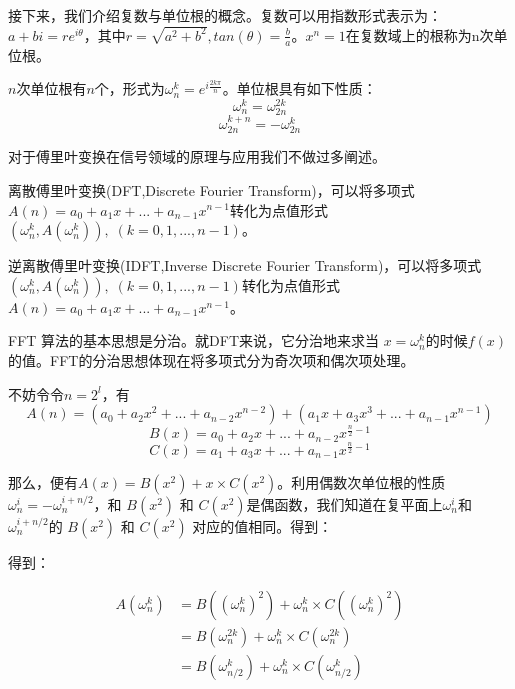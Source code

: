 \documentclass{article}
\begin{document}
接下来，我们介绍复数与单位根的概念。复数可以用指数形式表示为：$a+bi=re^{i\theta}$，其中$r=\sqrt{a^2+b^2},tan(\theta)=\frac{b}{a}$。$x^n=1$在复数域上的根称为n次单位根。

$n$次单位根有$n$个，形式为$\omega_n^k=e^{i\frac{2k\pi}{n}}$。单位根具有如下性质：
\begin{equation*}
    \omega_n^k=\omega_{2n}^{2k}
\end{equation*}
\begin{equation*}
    \omega_{2n}^{k+n}=-\omega_{2n}^k
\end{equation*}

对于傅里叶变换在信号领域的原理与应用我们不做过多阐述。

离散傅里叶变换(DFT,Discrete Fourier Transform)，可以将多项式$A(n)=a_0+a_1x+...+a_{n-1}x^{n-1}$转化为点值形式$(\omega_n^k,A(\omega_n^k)),\;(k=0,1,...,n-1)$。

逆离散傅里叶变换(IDFT,Inverse Discrete Fourier Transform)，可以将多项式$(\omega_n^k,A(\omega_n^k)),\;(k=0,1,...,n-1)$转化为点值形式$A(n)=a_0+a_1x+...+a_{n-1}x^{n-1}$。

FFT 算法的基本思想是分治。就DFT来说，它分治地来求当 
$x=\omega_n^k$的时候$f(x)$的值。FFT的分治思想体现在将多项式分为奇次项和偶次项处理。

不妨令令$n=2^l$，有
\begin{equation*}
    A(n)=(a_0+a_2x^2+...+a_{n-2}x^{n-2}) + (a_1x+a_3x^3+...+a_{n-1}x^{n-1})
\end{equation*}
\begin{equation*}
    B(x)=a_0+a_2x+...+a_{n-2}x^{\frac{n}{2}-1}
\end{equation*}
\begin{equation*}
    C(x)=a_1+a_3x+...+a_{n-1}x^{\frac{n}{2}-1}
\end{equation*}

那么，便有$A(x)=B(x^2)+x \times C(x^2)$。利用偶数次单位根的性质$\omega^i_n = -\omega^{i + n/2}_n$，和 $B\left(x^2\right)$ 和 $C\left(x^2\right)$是偶函数，我们知道在复平面上$\omega^i_n$和$\omega^{i+n/2}_n $的 $B(x^2)$ 和 $C(x^2)$ 对应的值相同。得到：

得到：

\begin{equation*}
\begin{split}
A(\omega_n^k) &= B((\omega_n^k)^2) + \omega_n^k  \times C((\omega_n^k)^2) \\ 
              &= B(\omega_n^{2k}) + \omega_n^k  \times C(\omega_n^{2k}) \\
              &= B(\omega_{n/2}^k) + \omega_n^k  \times C(\omega_{n/2}^k) \\
\end{split}
\end{equation*}
\end{document}
